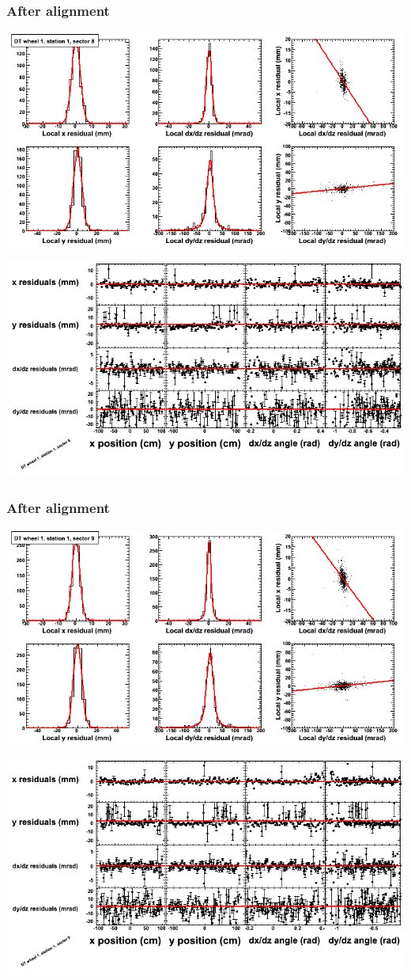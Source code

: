 \documentclass[compress]{beamer}
\begin{document}
\begin{frame}
\frametitle{After alignment}
\includegraphics[width=0.7\linewidth]{NOV4_fitfunctions/MBwhDst1sec08_bellcurves.png}

\includegraphics[width=0.7\linewidth]{NOV4_fitfunctions/MBwhDst1sec08_polynomials.png}
\end{frame}

\begin{frame}
\frametitle{After alignment}
\includegraphics[width=0.7\linewidth]{NOV4_fitfunctions/MBwhDst1sec09_bellcurves.png}

\includegraphics[width=0.7\linewidth]{NOV4_fitfunctions/MBwhDst1sec09_polynomials.png}
\end{frame}
\end{document}
